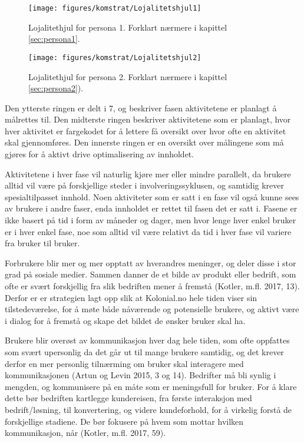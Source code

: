 \begin{figure}[H] 
    \centering
    \texttt{[image: figures/komstrat/Lojalitetshjul1]}
    \caption[Lojalitetshjul - persona 1]{Lojalitethjul for persona 1. Forklart nærmere i kapittel \ref{sec:persona1}.
    \label{fig:lojalpersona1}}
\end{figure}

\begin{figure}[H] 
    \centering
    \texttt{[image: figures/komstrat/Lojalitetshjul2]}
    \caption[Lojalitetshjul - persona 2]{Lojalitethjul for persona 2. Forklart nærmere i kapittel \ref{sec:persona2}).
    \label{fig:lojalpersona2}}
\end{figure}

Den ytterste ringen er delt i 7, og beskriver fasen aktivitetene er planlagt å målrettes til. Den midterste ringen beskriver aktivitetene som er planlagt, hvor hver aktivitet er fargekodet for å lettere få oversikt over hvor ofte en aktivitet skal gjennomføres. Den innerste ringen er en oversikt over målingene som må gjøres for å aktivt drive optimalisering av innholdet. 

Aktivitetene i hver fase vil naturlig kjøre mer eller mindre parallelt, da brukere alltid vil være på forskjellige steder i involveringssyklusen, og samtidig krever spesialtilpasset innhold. Noen aktiviteter som er satt i en fase vil også kunne sees av brukere i andre faser, enda innholdet er rettet til fasen det er satt i. Fasene er ikke basert på tid i form av måneder og dager, men hvor lenge hver enkel bruker er i hver enkel fase, noe som alltid vil være relativt da tid i hver fase vil variere fra bruker til bruker.

Forbrukere blir mer og mer opptatt av hverandres meninger, og deler disse i stor grad på sosiale medier. Sammen danner de et bilde av produkt eller bedrift, som ofte er svært forskjellig fra slik bedriften mener å fremstå (Kotler, m.fl. 2017, 13). Derfor er er strategien lagt opp slik at Kolonial.no hele tiden viser sin tilstedeværelse, for å møte både nåværende og potensielle brukere, og aktivt være i dialog for å fremstå og skape det bildet de ønsker bruker skal ha.

Brukere blir overøst av kommunikasjon hver dag hele tiden, som ofte oppfattes som svært upersonlig da det går ut til mange brukere samtidig, og det krever derfor en mer personlig tilnærming om bruker skal interagere med kommunikasjonen (Artun og Levin 2015, 3 og 14). Bedrifter må bli synlig i mengden, og kommunisere på en måte som er meningsfull for bruker. For å klare dette bør bedriften kartlegge kundereisen, fra første interaksjon med bedrift/løsning, til konvertering, og videre kundeforhold, for å virkelig forstå de forskjellige stadiene. De bør fokusere på hvem som mottar hvilken kommunikasjon, når (Kotler, m.fl. 2017, 59).

